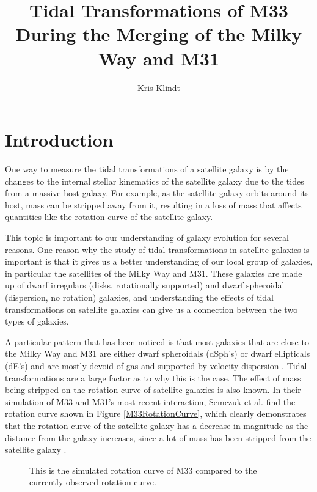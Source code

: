 \documentclass[trackchanges]{aastex7}
\begin{document}
\title{Tidal Transformations of M33 During the Merging of the Milky Way and M31}

\author{Kris Klindt}


\section{Introduction} 

One way to measure the tidal transformations of a satellite galaxy is by the changes to the internal stellar kinematics of the satellite galaxy due to the tides from a massive host galaxy. For example, as the satellite galaxy orbits around its host, mass can be stripped away from it, resulting in a loss of mass that affects quantities like the rotation curve of the satellite galaxy. 

This topic is important to our understanding of galaxy evolution for several reasons. One reason why the study of tidal transformations in satellite galaxies is important is that it gives us a better understanding of our local group of galaxies, in particular the satellites of the Milky Way and M31. These galaxies are made up of dwarf irregulars (disks, rotationally supported) and dwarf spheroidal (dispersion, no rotation) galaxies, and understanding the effects of tidal transformations on satellite galaxies can give us a connection between the two types of galaxies.

A particular pattern that has been noticed is that most galaxies that are close to the Milky Way and M31 are either dwarf spheroidals (dSph’s) or dwarf ellipticals (dE's) and are mostly devoid of gas and supported by velocity dispersion \citep{Mayer2001}. Tidal transformations are a large factor as to why this is the case. The effect of mass being stripped on the rotation curve of satellite galaxies is also known. In their simulation of M33 and M31's most recent interaction, Semczuk et al. find the rotation curve shown in Figure \ref{M33RotationCurve}, which clearly demonstrates that the rotation curve of the satellite galaxy has a decrease in magnitude as the distance from the galaxy increases, since a lot of mass has been stripped from the satellite galaxy \citep{Semczuk2018}.

\begin{figure}[ht!] \label{M33RotationCurve}
\caption{ This is the simulated rotation curve of M33 compared to the currently observed rotation curve.
\label{fig:general}}
\end{figure}
\end{document}
